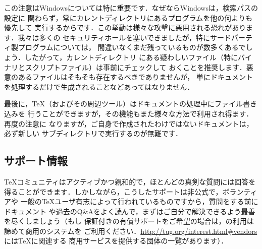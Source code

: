 \documentclass[uplatex,dvipdfmx]{jsarticle}
\begin{document}
この注意はWindowsについては特に重要です．なぜならWindowsは，検索パスの設定に
関わらず，常にカレントディレクトリにあるプログラムを他の何よりも優先して
実行するからです．この挙動は様々な攻撃に悪用される恐れがあります．我々は多くの
セキュリティホールを塞いできましたが，特にサードパーティ製プログラムについては，
間違いなくまだ残っているものが数多くあるでしょう．したがって，カレントディレクトリ
にある疑わしいファイル（特にバイナリとスクリプトファイル）は事前にチェックして
おくことを推奨します．悪意のあるファイルはそもそも存在するべきでありませんが，
単にドキュメントを処理するだけで生成されることなどあってはなりません．

最後に，\TeX （およびその周辺ツール）はドキュメントの処理中にファイル書き込みを
行うことができますが，その機能もまた様々な方法で利用され得ます．再度の注意に
なりますが，ご自身で作成されたわけではないドキュメントは，必ず新しい
サブディレクトリで実行するのが無難です．

\subsection{サポート情報}
\label{sec:help}

\TeX コミュニティはアクティブかつ親和的で，ほとんどの真剣な質問には回答を
得ることができます．しかしながら，こうしたサポートは非公式で，ボランティアや
一般の\TeX ユーザ有志によって行われているものですから，質問をする前にドキュメント
や過去のQ\&Aをよく読んで，まずはご自分で解決できるよう最善を尽くしましょう（もし
保証付きの有償サポートをご希望の場合は，\TL の利用は諦めて商用のシステムを
ご利用ください．\url{http://tug.org/interest.html#vendors}には\TeX に関連する
商用サービスを提供する団体の一覧があります）．
\end{document}

